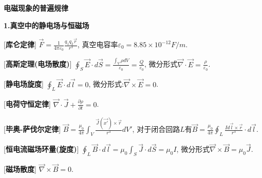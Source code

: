 


 \begin{center} 
 \Large \textbf{电磁现象的普遍规律}
\end{center}
 
\large 
\begin{center}
 \textbf{1.真空中的静电场与恒磁场}
\end{center}

[\textbf{库仑定律}] $\vec F=\frac{1}{4\pi\varepsilon_0}\frac{q_1q_2\vec r}{r^3}$, 真空电容率$\varepsilon_0=8.85\times 10^{-12}F/m$.\par

[\textbf{高斯定理(电场散度)}] $\oint_S\vec E\cdot d\vec S=\frac{\int_V\rho dV}{\varepsilon_0}=\frac{Q}{\varepsilon_0}$, 微分形式$\vec \nabla\cdot\vec E=\frac{\rho}{\varepsilon_0}$.\par

[\textbf{静电场旋度}] $\oint_L\vec E\cdot d\vec l=0$, 微分形式:$\vec \nabla\times\vec E=0$.\par

[\textbf{电荷守恒定律}] $\vec \nabla\cdot \vec J+\frac{\partial \rho}{\partial t}=0$.\par

[\textbf{毕奥-萨伐尔定律}] $\vec B=\frac{\mu_0}{4\pi}\int_V\frac{\vec J(\vec{x'})\times \vec r}{r^3}dV'$, 对于闭合回路$L$有$\vec B=\frac{\mu_0}{4\pi}\oint_L\frac{Id\vec l\times\vec r}{r^3}\cdot d\vec l$.\par

[\textbf{恒电流磁场环量(旋度)}] $\oint_L \vec B\cdot d\vec l=\mu_0\int_S\vec J\cdot d\vec S=\mu_0I$, 微分形式$\vec \nabla\times\vec B=\mu_0\vec J$.\par

[\textbf{磁场散度}] $\vec\nabla\times\vec B=0$.\par

